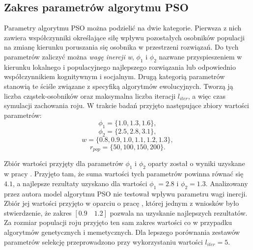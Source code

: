 \subsection{Zakres parametrów algorytmu PSO}
\par
Parametry algorytmu PSO można podzielić na dwie kategorie. Pierwsza z nich zawiera współczynniki określające siłę wpływu pozostałych osobników populacji na zmianę kierunku poruszania się osobnika w przestrzeni rozwiązań. Do tych parametrów zaliczyć można \emph{wagę inercji w}, $\phi_1$ i $\phi_2$ nazwane przyspieszeniem w kierunku lokalnego i populacyjnego najlepszego rozwiązania lub odpowiednio współczynnikiem kognitywnym i socjalnym. Drugą kategorią parametrów stanowią te ściśle związane z specyfiką algorytmów ewolucyjnych. Tworzą ją liczba cząstek-osobników oraz maksymalna liczba iteracji $l_{iter}$, a więc czas symulacji zachowania roju. W trakcie badań przyjęto następujące zbiory wartości parametrów:
\[\phi_1 = \lbrace1.0, 1.3, 1.6 \rbrace,\]
\[\phi_2 = \lbrace2.5, 2.8, 3.1\rbrace,\]
\[w = \lbrace0.8, 0.9, 1.0, 1.1, 1.2, 1.3\rbrace,\]
\[r_{pop} = \lbrace50, 100, 150, 200\rbrace.\]

\par
Zbiór wartości przyjęty dla parametrów $\phi_1$ i $\phi_2$ oparty został o wyniki uzyskane w pracy \cite{carlisle2002applying}. Przyjęto tam, że suma wartości tych parametrów powinna równać się $4.1$, a najlepsze rezultaty uzyskano dla wartości $\phi_1=2.8$ i $\phi_2=1.3$. Analizowany przez autora model algorytmu PSO nie testował wpływu parametru wagi inercji. Zbiór jej wartości przyjęto w oparciu o pracę \cite{shi1998modified}, której jednym z wniosków było stwierdzenie, że zakres $[0.9\quad1.2]$ pozwala na uzyskanie najlepszych rezultatów. Za rozmiar populacji roju przyjęto ten sam zakres wartości co w przypadku algorytmów genetycznych i memetycznych. Dla lepszego porównania zestawów parametrów selekcję przeprowadzono przy wykorzystaniu wartości $l_{iter}=5$.

